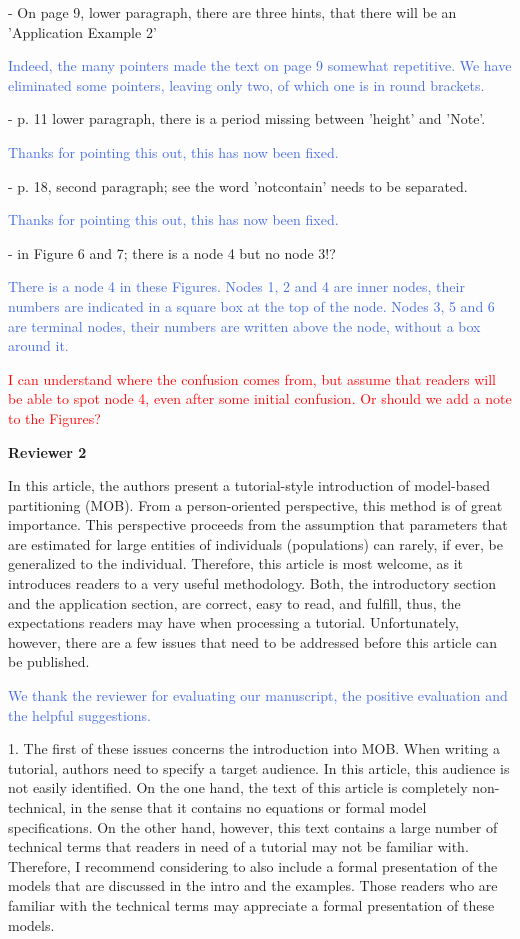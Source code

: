 \documentclass{letter}
\newcommand{\auth}[1]{\textcolor{RoyalBlue}{#1}}
\newcommand{\MF}[1]{\textcolor{red}{#1}}
\begin{document}
- On page 9, lower paragraph, there are three hints, that there will be an 'Application Example 2'

\auth{Indeed, the many pointers made the text on page 9 somewhat repetitive. We have eliminated some pointers, leaving only two, of which one is in round brackets.}

- p. 11 lower paragraph, there is a period missing between 'height' and 'Note'.

\auth{Thanks for pointing this out, this has now been fixed.}

- p. 18, second paragraph; see the word 'notcontain' needs to be separated.

\auth{Thanks for pointing this out, this has now been fixed.}

- in Figure 6 and 7; there is a node 4 but no node 3!?

\auth{There is a node 4 in these Figures. Nodes 1, 2 and 4 are inner nodes, their numbers are indicated in a square box at the top of the node. Nodes 3, 5 and 6 are terminal nodes, their numbers are written above the node, without a box around it.}

\MF{I can understand where the confusion comes from, but assume that readers will be able to spot node 4, even after some initial confusion. Or should we add a note to the Figures?}


\textbf{Reviewer 2}

In this article, the authors present a tutorial-style introduction of model-based partitioning (MOB). From a person-oriented perspective, this method is of great importance. This perspective proceeds from the assumption that parameters that are estimated for large entities of individuals (populations) can rarely, if ever, be generalized to the individual. Therefore, this article is most welcome, as it introduces readers to a very useful methodology. Both, the introductory section and the application section, are correct, easy to read, and fulfill, thus, the expectations readers may have when processing a tutorial. Unfortunately, however, there are a few issues that need to be addressed before this article can be published.

\auth{We thank the reviewer for evaluating our manuscript, the positive evaluation and the helpful suggestions.}

1. The first of these issues concerns the introduction into MOB. When writing a tutorial, authors need to specify a target audience. In this article, this audience is not easily identified. On the one hand, the text of this article is completely non-technical, in the sense that it contains no equations or formal model specifications. On the other hand, however, this text contains a large number of technical terms that readers in need of a tutorial may not be familiar with. Therefore, I recommend considering to also include a formal presentation of the models that are discussed in the intro and the examples. Those readers who are familiar with the technical terms may appreciate a formal presentation of these models.
\end{document}
